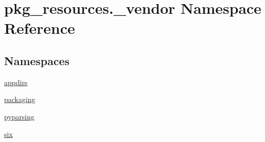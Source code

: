 \hypertarget{namespacepkg__resources_1_1__vendor}{}\section{pkg\+\_\+resources.\+\_\+vendor Namespace Reference}
\label{namespacepkg__resources_1_1__vendor}
\subsection*{Namespaces}
\begin{DoxyCompactItemize}
\item 
 \hyperlink{namespacepkg__resources_1_1__vendor_1_1appdirs}{appdirs}
\item 
 \hyperlink{namespacepkg__resources_1_1__vendor_1_1packaging}{packaging}
\item 
 \hyperlink{namespacepkg__resources_1_1__vendor_1_1pyparsing}{pyparsing}
\item 
 \hyperlink{namespacepkg__resources_1_1__vendor_1_1six}{six}
\end{DoxyCompactItemize}
